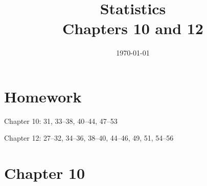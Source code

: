 \documentclass[letterpaper]{exam}
\title{Statistics \\ Chapters 10 and 12}
\date{\today}
\author{}
\begin{document}
  \maketitle

  \ifprintanswers{}
  \else
    \section{Homework}
    \begin{itemize*}
      \item Chapter 10: 31, 33--38, 40--44, 47--53
      \item Chapter 12: 27--32, 34--36, 38--40, 44--46, 49, 51, 54--56
    \end{itemize*}
  \fi

  \ifprintanswers{}
  \section{Chapter 10} %
  
\end{document}
